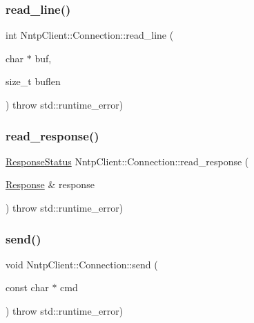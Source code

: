 \hypertarget{class_nntp_client_1_1_connection_a4be644ac15bed1aac402e7562a6c2f3e}{}\label{class_nntp_client_1_1_connection_a4be644ac15bed1aac402e7562a6c2f3e} 
\subsubsection{\texorpdfstring{read\+\_\+line()}{read\_line()}}
{\footnotesize\ttfamily int Nntp\+Client\+::\+Connection\+::read\+\_\+line (\begin{DoxyParamCaption}\item[{char $\ast$}]{buf,  }\item[{size\+\_\+t}]{buflen }\end{DoxyParamCaption}) throw  std\+::runtime\+\_\+error) }

\hypertarget{class_nntp_client_1_1_connection_a7eb4da715f24ad554dac36642f46850a}{}\label{class_nntp_client_1_1_connection_a7eb4da715f24ad554dac36642f46850a} 
\subsubsection{\texorpdfstring{read\+\_\+response()}{read\_response()}}
{\footnotesize\ttfamily \hyperlink{namespace_nntp_client_a920c73a4038b2a2c307245b909b43203}{Response\+Status} Nntp\+Client\+::\+Connection\+::read\+\_\+response (\begin{DoxyParamCaption}\item[{\hyperlink{class_nntp_client_1_1_response}{Response} \&}]{response }\end{DoxyParamCaption}) throw  std\+::runtime\+\_\+error) }

\hypertarget{class_nntp_client_1_1_connection_a49adc2c2fc472d6066dbd4282a28ba6a}{}\label{class_nntp_client_1_1_connection_a49adc2c2fc472d6066dbd4282a28ba6a} 
\subsubsection{\texorpdfstring{send()}{send()}\hspace{0.1cm}{\footnotesize\ttfamily [1/3]}}
{\footnotesize\ttfamily void Nntp\+Client\+::\+Connection\+::send (\begin{DoxyParamCaption}\item[{const char $\ast$}]{cmd }\end{DoxyParamCaption}) throw  std\+::runtime\+\_\+error) }

